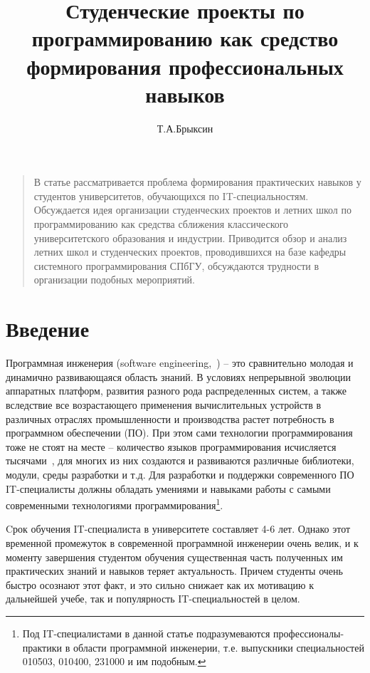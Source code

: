 \documentclass[a5paper]{article}
\title{Студенческие проекты по программированию как средство формирования профессиональных навыков}
\author{Т.А.Брыксин}
\date{}
\begin{document}
\maketitle
\thispagestyle{empty}

\begin{quote}
\small\noindent
В статье рассматривается проблема формирования практических навыков у студентов университетов, обучающихся по IT-специальностям. Обсуждается идея организации студенческих проектов и летних школ по программированию как средства сближения классического университетского образования и индустрии. Приводится обзор и анализ летних школ и студенческих проектов, проводившихся на базе кафедры системного программирования СПбГУ, обсуждаются трудности в организации подобных мероприятий.
\end{quote}

\section*{Введение} 
Программная инженерия (software engineering,~\cite{swebok}) -- это сравнительно молодая и динамично развивающаяся область знаний. В условиях непрерывной эволюции аппаратных платформ, развития разного рода распределенных систем, а также вследствие все возрастающего применения вычислительных устройств в различных отраслях промышленности и производства растет потребность в программном обеспечении (ПО).  При этом сами технологии программирования тоже не стоят на месте -- количество языков программирования исчисляется тысячами~\cite{langList}, для многих из них создаются и развиваются различные библиотеки, модули, среды разработки и т.д. Для разработки и поддержки современного ПО IT-специалисты должны обладать умениями и навыками работы с самыми современными технологиями программирования\footnote{Под IT-специалистами в данной статье подразумеваются профессионалы-практики в области программной инженерии, т.е. выпускники специальностей 010503, 010400, 231000 и им подобным.}. 
 
Cрок обучения IT-специалиста в университете составляет 4-6 лет. Однако этот временной промежуток  в современной программной инженерии очень велик, и к моменту завершения студентом обучения существенная часть полученных им практических знаний и навыков теряет актуальность. Причем студенты очень быстро осознают этот факт, и это сильно снижает как их мотивацию к дальнейшей учебе, так и популярность IT-специальностей в целом. 
\end{document}
